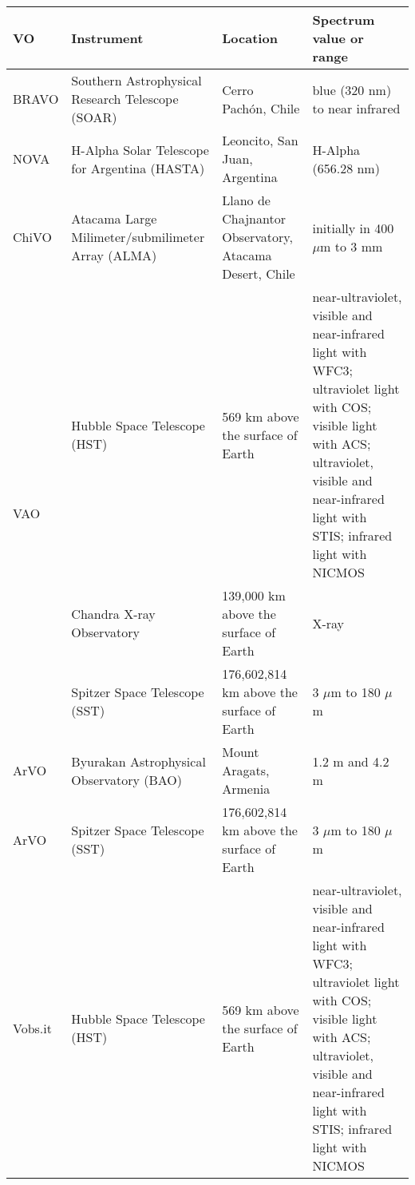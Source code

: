 \begin{table*}[h!t]
\centering
\begin{tabular}{|p{1cm}|p{4cm}|p{5cm}|p{6cm}|}
    \hline                                                                      
    \textbf{VO} & \textbf{Instrument} & \textbf{Location} &
    \textbf{Spectrum value or range} \\
    \hline                                                                      
    BRAVO & Southern Astrophysical Research
    Telescope (SOAR) & Cerro Pach\'{o}n, Chile & blue (320 nm) to near infrared
    \cite{website:SOAR_EMS} \\
    \hline                                                                      
    NOVA & H-Alpha Solar Telescope for
    Argentina (HASTA) & Leoncito, San Juan, Argentina & H-Alpha (656.28 nm)
    \cite{website:HASTA_EMS} \\
    \hline
    ChiVO & Atacama Large Milimeter/submilimeter
    Array (ALMA) & Llano de Chajnantor Observatory, Atacama Desert, Chile &
    initially in 400 $ \mu $m to 3 mm \cite{website:ALMA_EMS} \\
    \hline
    \multirow{3}{3cm}{VAO} & Hubble Space
    Telescope (HST) & 569 km above the surface of Earth & near-ultraviolet,
    visible and near-infrared light with WFC3; ultraviolet light with COS;
    visible light with ACS; ultraviolet, visible and near-infrared light with
    STIS; infrared light with NICMOS \cite{website:HST_EMS} \\
     \cline{2-4}
     & Chandra X-ray Observatory & 139,000 km above the surface of Earth & X-ray
     \cite{website:Chandra_EMS} \\
     \cline{2-4}
     & Spitzer Space Telescope (SST) & 176,602,814 km above the surface of Earth
     \cite{website:SST_EMS_1} & 3 $ \mu $m to 180 $ \mu $m
     \cite{website:SST_EMS_2} \\
    \hline
    ArVO & Byurakan Astrophysical Observatory
    (BAO) & Mount Aragats, Armenia & 1.2 m and 4.2 m \cite{website:BAO_EMS} \\
    \hline
    ArVO & Spitzer Space Telescope (SST) &
    176,602,814 km above the surface of Earth & 3 $ \mu $m to 180 $ \mu $m \\
    \hline
    Vobs.it & Hubble Space Telescope (HST) & 569
    km above the surface of Earth & near-ultraviolet, visible and near-infrared
    light with WFC3; ultraviolet light with COS; visible light with ACS;
    ultraviolet, visible and near-infrared light with STIS; infrared light with
    NICMOS \\

\end{tabular}
\end{table*}
